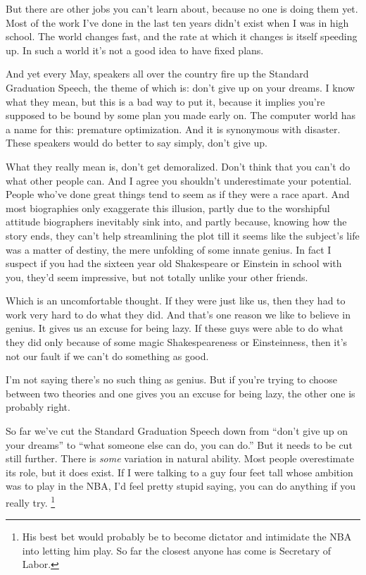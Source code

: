 \documentclass[12pt]{book}
\begin{document}
But there are other jobs you can't learn about, because no one is doing
them yet. Most of the work I've done in the last ten years didn't exist
when I was in high school. The world changes fast, and the rate at which
it changes is itself speeding up. In such a world it's not a good idea
to have fixed plans.

And yet every May, speakers all over the country fire up the Standard
Graduation Speech, the theme of which is: don't give up on your dreams.
I know what they mean, but this is a bad way to put it, because it
implies you're supposed to be bound by some plan you made early on. The
computer world has a name for this: premature optimization. And it is
synonymous with disaster. These speakers would do better to say simply,
don't give up.

What they really mean is, don't get demoralized. Don't think that you
can't do what other people can. And I agree you shouldn't underestimate
your potential. People who've done great things tend to seem as if they
were a race apart. And most biographies only exaggerate this illusion,
partly due to the worshipful attitude biographers inevitably sink into,
and partly because, knowing how the story ends, they can't help
streamlining the plot till it seems like the subject's life was a matter
of destiny, the mere unfolding of some innate genius. In fact I suspect
if you had the sixteen year old Shakespeare or Einstein in school with
you, they'd seem impressive, but not totally unlike your other friends.

Which is an uncomfortable thought. If they were just like us, then they
had to work very hard to do what they did. And that's one reason we like
to believe in genius. It gives us an excuse for being lazy. If these
guys were able to do what they did only because of some magic
Shakespeareness or Einsteinness, then it's not our fault if we can't do
something as good.

I'm not saying there's no such thing as genius. But if you're trying to
choose between two theories and one gives you an excuse for being lazy,
the other one is probably right.

So far we've cut the Standard Graduation Speech down from ``don't give
up on your dreams'' to ``what someone else can do, you can do.'' But it
needs to be cut still further. There is \emph{some} variation in natural
ability. Most people overestimate its role, but it does exist. If I were
talking to a guy four feet tall whose ambition was to play in the NBA,
I'd feel pretty stupid saying, you can do anything if you really try.
\footnote{His best bet would probably be to become dictator and intimidate
the NBA into letting him play. So far the closest anyone has come is
Secretary of Labor.}
\end{document}
